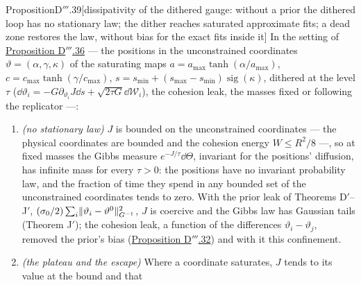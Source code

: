 \begin{thm}{Proposition}{D$'''$.39}[dissipativity of the dithered gauge: without a prior the dithered loop has no
stationary law; the dither reaches saturated approximate fits; a dead zone restores the law, without bias for the exact
fits inside it]\label{res:thmDppp:39}%
In the setting of \hyperref[res:thmDppp:36]{Proposition D$'''$.36} --- the positions in the unconstrained coordinates
$\vartheta = (\alpha,\gamma,\kappa)$ of the saturating maps $a = a_{\max}\tanh(\alpha/a_{\max})$,
$c = c_{\max}\tanh(\gamma/c_{\max})$, $s = s_{\min} + (s_{\max} - s_{\min})\operatorname{sig}(\kappa)$, dithered at the
level $\tau$ ($\dd\vartheta_i = -G\partial_{\vartheta_i}J\dd s + \sqrt{2\tau G}\dd\mathcal W_i$), the cohesion leak, the
masses fixed or following the replicator ---:
\begin{enumerate}[label=\textup{(\roman*)}]
  \item \emph{(no stationary law)} $J$ is bounded on the unconstrained coordinates --- the physical coordinates are
    bounded and the cohesion energy $W\le R^2/8$ ---, so at fixed masses the Gibbs measure $e^{-J/\tau}\dd\Theta$,
    invariant for the positions' diffusion, has infinite mass for every $\tau > 0$: the positions have no invariant
    probability law, and the fraction of time they spend in any bounded set of the unconstrained coordinates tends to
    zero. With the prior leak of Theorems D$'$--J$'$, $(\sigma_0/2)\sum_i\lVert \vartheta_i - \vartheta^0\rVert^2_{G^{-1}}$,
    $J$ is coercive and the Gibbs law has Gaussian tails (Theorem J$'$); the cohesion leak, a function of the
    differences $\vartheta_i - \vartheta_j$, removed the prior's bias (\hyperref[res:thmDppp:32]{Proposition
    D$'''$.32}) and with it this confinement.
  \item \emph{(the plateau and the escape)} Where a coordinate saturates, $J$ tends to its value at the bound and that

\end{enumerate}
\end{thm}
